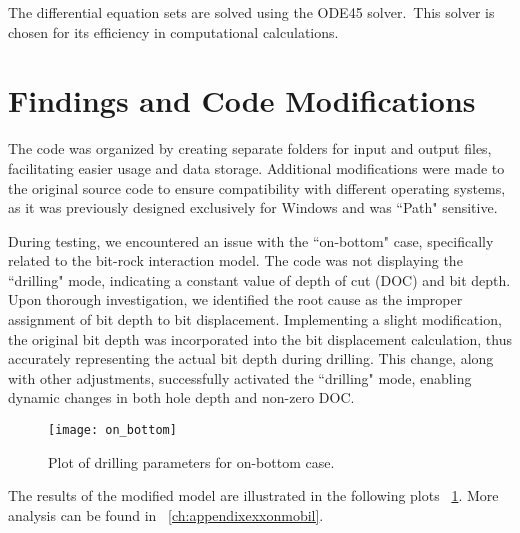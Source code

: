 \begin{mathwhere}[1.0in]
\end{mathwhere}

The differential equation sets are solved using the ODE45 solver.\ This solver is chosen for its efficiency in computational calculations.


\section{Findings and Code Modifications}
 
The code was organized by creating separate folders for input and output files, facilitating easier usage and data storage. Additional modifications were made to the original source code to ensure compatibility with different operating systems, as it was previously designed exclusively for Windows and was ``Path" sensitive.

During testing, we encountered an issue with the ``on-bottom" case, specifically related to the bit-rock interaction model. The code was not displaying the ``drilling" mode, indicating a constant value of depth of cut (DOC) and bit depth. Upon thorough investigation, we identified the root cause as the improper assignment of bit depth to bit displacement. Implementing a slight modification, the original bit depth was incorporated into the bit displacement calculation, thus accurately representing the actual bit depth during drilling. This change, along with other adjustments, successfully activated the ``drilling" mode, enabling dynamic changes in both hole depth and non-zero DOC.

\begin{figure}
  \centering
  \texttt{[image: on\_bottom]}
  \caption[Plots of on-bottom case]{Plot of drilling parameters for on-bottom case.}\label{findings}
\end{figure}

The results of the modified model are illustrated in the following plots \figurename~\ref{findings}. More analysis can be found in \appendixname~\ref{ch:appendixexxonmobil}. 